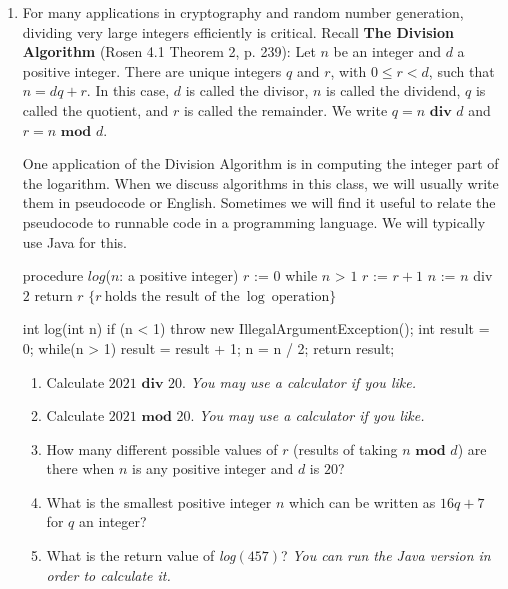 \documentclass[12pt, oneside]{article}
\begin{document}
\begin{enumerate}
\begin{enumerate}
\end{enumerate}
{\it Bonus - not for credit: Describe each of the sets above using roster method.}


\item For many applications in cryptography and random number generation,
dividing very large integers efficiently is critical.  Recall {\bf The Division Algorithm} (Rosen 4.1 Theorem 2, p. 239):
 Let $n$ be an integer 
and $d$ a positive integer. There are unique integers $q$ and $r$, with $0 \leq r < d$, such that 
$n = dq + r$. In this case, $d$ is called the divisor, $n$ is called the dividend, $q$ is called the quotient, 
and $r$ is called the remainder. We write $q=n \textbf{ div } d$ and $r=n \textbf{ mod } d$.

One application of the Division Algorithm is in computing the integer part of the logarithm.
When we discuss algorithms in this class, we will usually write them in 
pseudocode or English. Sometimes we will find it useful to relate the pseudocode to
runnable code in a programming language. We will typically use Java for this.

\begin{multicols}{2}
\begin{algorithm}[caption={Calculating log in pseudocode}]
procedure $\textit{log}$($n$: a positive integer)
$r$ := $0$
while $n$ > $1$
  $r$ := $r + 1$
  $n$ := $n$ div $2$
return $r$ $\{ r~\textrm{holds the result of the}~\log~\textrm{operation}\} $
\end{algorithm}
\columnbreak
\begin{java}[caption={Calculating log in Java}]
int log(int n) {
  if (n < 1) { 
    throw new IllegalArgumentException(); 
  }
  int result = 0;
  while(n > 1) {
    result = result + 1;
    n = n / 2;
  }
  return result;
}
\end{java}
\end{multicols}


\begin{enumerate}
\item Calculate $2021 \textbf{ div } 20$.  {\it You may use a calculator if you like.}
\item Calculate $2021 \textbf{ mod } 20$.  {\it You may use a calculator if you like.}
\item How many different possible values of $r$ (results of taking $n \textbf{ mod } d$) are there when 
$n$ is any positive integer and $d$ is $20$?
\item What is the smallest positive integer $n$ which can be written as $16q+7$ for $q$ an integer?
\item What is the return value of \textit{log$(457)$}?
{\it You can run the Java version in order to calculate it.}
\end{enumerate}



\end{enumerate}
\end{document}
